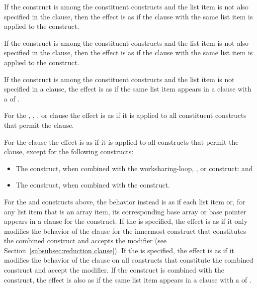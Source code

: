 \begin{itemize}
If the  construct is among the constituent constructs and the
list item is not also specified in the  clause, then the 
effect is as if the  clause with the same list item is applied 
to the  construct.

If the  construct is among the constituent constructs and the
list item is not also specified in the  clause, then the 
effect is as if the  clause with the same list item is applied 
to the  construct.

If the  construct is among the constituent constructs and the 
list item is not specified in a  clause, the effect is as if the same 
list item appears in a  clause with a  of .

For the , , , or  
clause the effect is as if it is applied to all constituent constructs that 
permit the clause.

For the  clause the effect is as if it is applied to all 
constructs that permit the clause, except for the following constructs:

\begin{itemize}
\item The  construct, when combined with the
      worksharing-loop, , or  construct: and
\item The  construct,  when combined with the  construct.
\end{itemize}

For the  and  constructs above, the behavior
instead is as if each list item or, for any list item that is an array item, 
its corresponding base array or base pointer appears in a  clause 
for the construct. If the   is specified, 
the effect is as if it only modifies the behavior of the  clause 
for the innermost construct that constitutes the combined construct and accepts 
the modifier (see Section~\ref{subsubsec:reduction clause}). If the 
 is specified, the effect is as if it modifies the
behavior of the  clause on all constructs that constitute
the combined construct and accept the modifier.  If the construct is combined with
the  construct, the effect is also as if the same list item
appears in a  clause with a  of .


\end{itemize}
